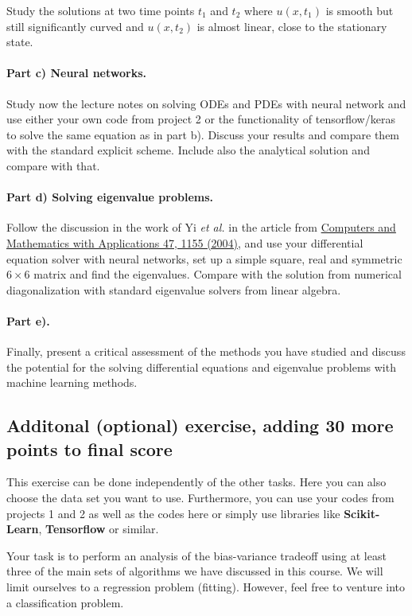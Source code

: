 \documentclass[%
oneside,                 %
final,                   %
10pt]{article}
\begin{document}
Study the solutions at two time points $t_1$ and $t_2$ where $u(x,t_1)$ is smooth but still significantly curved
and $u(x,t_2)$ is almost linear, close to the stationary state.

\paragraph{Part c) Neural networks.}
Study now the lecture notes on solving ODEs and PDEs with neural
network and use either your own code from project 2 or the
functionality of tensorflow/keras to solve the same equation as in
part b).  Discuss your results and compare them with the standard
explicit scheme. Include also the analytical solution and compare with
that.

\paragraph{Part d) Solving eigenvalue problems.}
Follow the discussion in the work of Yi \emph{et al.} in the article from
\href{{https://www.sciencedirect.com/science/article/pii/S0898122104901101}}{Computers and Mathematics with Applications 47, 1155 (2004)}, and
use your differential equation solver with neural networks, set up a
simple square, real and symmetric $6\times 6$ matrix and find the
eigenvalues. Compare with the solution from numerical diagonalization with standard eigenvalue solvers from linear algebra.

\paragraph{Part e).}
Finally, present a critical assessment of the methods you have studied and discuss the potential for the solving differential equations and eigenvalue problems with machine learning methods. 

\subsection*{Additonal (optional) exercise, adding 30 more points to final score}

This exercise can be done independently of the other tasks. Here you
can also choose the data set you want to use. Furthermore, you can use
your codes from projects 1 and 2 as well as the codes here or simply use
libraries like \textbf{Scikit-Learn}, \textbf{Tensorflow} or similar.

Your task is to perform an analysis of the bias-variance tradeoff
using at least three of the main sets of  algorithms we have discussed in this
course. We will limit ourselves to a regression problem (fitting). However, feel free to venture into a classification problem.
\end{document}
